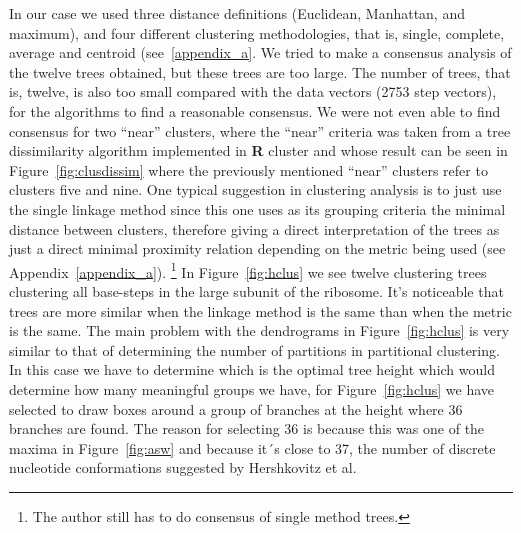 In our case we  used three distance definitions (Euclidean, Manhattan,
and maximum),  and four  different clustering methodologies,  that is,
single, complete, average  and centroid (see~\ref{appendix_a}. We tried to  make a consensus
analysis of the twelve trees  obtained, but these trees are too large.
The number of trees, that is, twelve, is also too small compared with
the data vectors (2753 step vectors), for  the algorithms to find a  reasonable consensus. 
We were not even able  to find consensus for two  ``near'' clusters, where the
``near''  criteria  was  taken   from  a  tree dissimilarity algorithm
implemented in  \textbf{R}  cluster and   whose   result   can    be   
seen   in Figure~\ref{fig:clusdissim} where the previously mentioned 
``near'' clusters refer to clusters five and nine.  
One  typical  suggestion  in  clustering
analysis is to just use the  single linkage method since this one uses
as  its  grouping  criteria  the minimal  distance  between  clusters,
therefore giving a direct interpretation of the trees as just a direct
minimal  proximity   relation  depending  on  the   metric  being used
(see Appendix~\ref{appendix_a}). \footnote{The  author still has to  do
consensus of single  method trees.}  In  Figure~\ref{fig:hclus} we
see twelve
clustering trees clustering all base-steps in the large subunit of the
ribosome. It's noticeable that trees are more similar  when the linkage
method is the same than when the metric is the same. The main problem 
with the dendrograms in Figure~\ref{fig:hclus} is very similar to that 
of determining the number of partitions in partitional clustering. In
this case we have to determine which is the optimal tree height which 
would determine how many meaningful groups we have, for 
Figure~\ref{fig:hclus} we have selected to draw boxes around a group of 
branches at the height where 36 branches are found. The reason for 
selecting 36 is because this was one of the maxima in Figure~\ref{fig:asw}
and because it´s close to 37, the number of discrete nucleotide conformations
suggested by Hershkovitz et al. \cite{hershkovitz2006}

